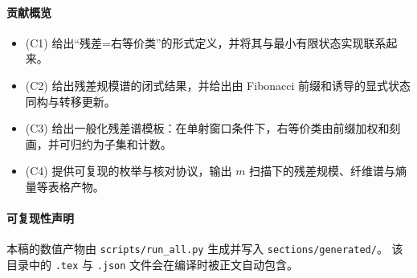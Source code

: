 
\begin{abstract}
给定有限窗口本体空间 $\Omega_m=\{0,1\}^m$ 与稳定输出语言 $X_m\subset\{0,1\}^m$（禁止子词 $11$），
折叠映射 $\Fold_m:\Omega_m\twoheadrightarrow X_m$ 将窗口微态规范化为 Zeckendorf 约束下的稳定词。
本文聚焦于一个更强的问题：当我们不仅需要输出 $\Fold_m(b)$，还希望保留最少的附加信息使得后续任务
（例如可逆化、搜索或预测接口）可被有限状态实现时，\emph{最小残差}应如何定义并如何计算？

本文提出一个以 Myhill--Nerode 右等价为核心的残差最小化框架：把“对未来输入的响应”视为右作用下的等价类，
从而将残差集合刻画为最小有限状态结构的状态集。作为主结果之一，我们对本文所定义的 $\Fold_m$ 给出残差规模谱
闭式与显式整数状态同构；进一步给出一个一般化模板：在“截断编码在某个整数区间上保持单射”的条件下，
深度 $k$ 的右等价类与前缀加权和一一对应，从而把残差计数归约为子集和计数问题。
\end{abstract}

\paragraph{贡献概览}
\begin{itemize}
  \item (C1) 给出“残差=右等价类”的形式定义，并将其与最小有限状态实现联系起来。
  \item (C2) 给出残差规模谱的闭式结果，并给出由 Fibonacci 前缀和诱导的显式状态同构与转移更新。
  \item (C3) 给出一般化残差谱模板：在单射窗口条件下，右等价类由前缀加权和刻画，并可归约为子集和计数。
  \item (C4) 提供可复现的枚举与核对协议，输出 $m$ 扫描下的残差规模、纤维谱与熵量等表格产物。
\end{itemize}

\paragraph{可复现性声明}
本稿的数值产物由 \verb|scripts/run_all.py| 生成并写入 \verb|sections/generated/|。
该目录中的 \verb|.tex| 与 \verb|.json| 文件会在编译时被正文自动包含。

